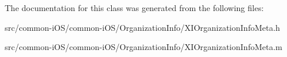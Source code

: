 The documentation for this class was generated from the following files\+:\begin{DoxyCompactItemize}
\item 
src/common-\/i\+O\+S/common-\/i\+O\+S/\+Organization\+Info/X\+I\+Organization\+Info\+Meta.\+h\item 
src/common-\/i\+O\+S/common-\/i\+O\+S/\+Organization\+Info/X\+I\+Organization\+Info\+Meta.\+m\end{DoxyCompactItemize}

